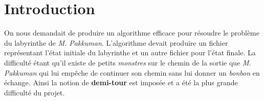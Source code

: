 \section{Introduction}

On nous demandait de produire un algorithme efficace pour résoudre le problème du labyrinthe de \textit{M. Pakkuman}. L'algorithme devait produire un fichier représentant l'état initiale du labyrinthe et un autre fichier pour l'état finale. La difficulté étant qu'il existe de petits \textit{monstres} sur le chemin de la sortie que \textit{M. Pakkuman} qui lui empêche de continuer son chemin sans lui donner un \textit{bonbon} en échange. Ainsi la notion de \textbf{demi-tour} est imposée et a été la plus grande difficulté du projet.